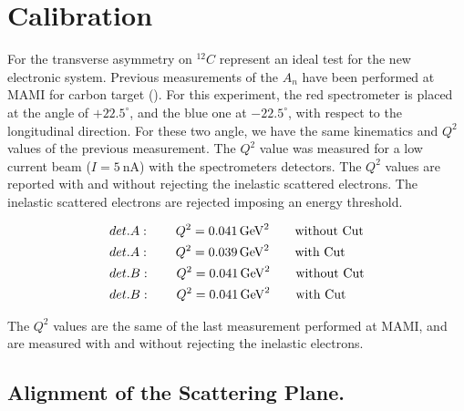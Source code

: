 \newpage
\section{Calibration}

For the transverse asymmetry on $^{12}C$ represent an ideal test for the new electronic system. Previous measurements of the $A_{n}$ have been performed at MAMI for carbon target (\cite{Esser:2018vdp}). For this experiment, the red spectrometer is placed at the angle of $+22.5^{\circ}$, and the blue one at $-22.5^{\circ}$, with respect to the longitudinal direction. For these two angle, we have the same kinematics and $Q^{2}$ values of the previous measurement. The $Q^{2}$ value was measured for a low current beam ($I = \SI{5}{\nano \ampere}$) with the spectrometers detectors. The $Q^{2}$ values are reported with and without rejecting the inelastic scattered electrons. The inelastic scattered electrons are rejected imposing an energy threshold. 

\begin{flushleft}
\begin{align*}
& det. A : \qquad Q^{2} = \SI{0.041}{\giga \electronvolt \squared} \qquad \textnormal{without Cut} \\
& det. A : \qquad Q^{2} = \SI{0.039}{\giga \electronvolt \squared} \qquad \textnormal{with Cut} \\
& det. B : \qquad Q^{2} = \SI{0.041}{\giga \electronvolt \squared} \qquad \textnormal{without Cut} \\
& det. B : \qquad Q^{2} = \SI{0.041}{\giga \electronvolt \squared} \qquad \textnormal{with Cut} 
\end{align*} 
\end{flushleft}

The $Q^{2}$ values are the same of the last measurement performed at MAMI, and are measured with and without rejecting the inelastic electrons. 

\subsection{Alignment of the Scattering Plane.}

